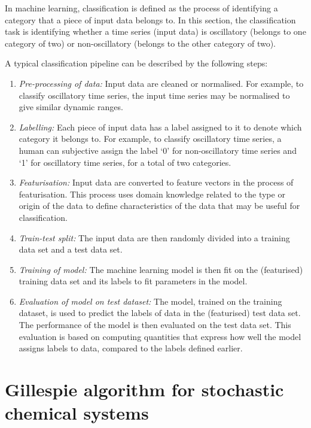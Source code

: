In machine learning, classification is defined as the process of identifying a category that a piece of input data belongs to.
In this section, the classification task is identifying whether a time series (input data) is oscillatory (belongs to one category of two) or non-oscillatory (belongs to the other category of two).

A typical classification pipeline can be described by the following steps:
\begin{enumerate}
  \item \emph{Pre-processing of data:} Input data are cleaned or normalised.
        For example, to classify oscillatory time series, the input time series may be normalised to give similar dynamic ranges.
  \item \emph{Labelling:} Each piece of input data has a label assigned to it to denote which category it belongs to.
        For example, to classify oscillatory time series, a human can subjective assign the label `0' for non-oscillatory time series and `1' for oscillatory time series, for a total of two categories.
  \item \emph{Featurisation:} Input data are converted to feature vectors in the process of featurisation.
        This process uses domain knowledge related to the type or origin of the data to define characteristics of the data that may be useful for classification.
  \item \emph{Train-test split:} The input data are then randomly divided into a training data set and a test data set.
  \item \emph{Training of model:} The machine learning model is then fit on the (featurised) training data set and its labels to fit parameters in the model.
  \item \emph{Evaluation of model on test dataset:}
        The model, trained on the training dataset, is used to predict the labels of data in the (featurised) test data set.
        The performance of the model is then evaluated on the test data set.
        This evaluation is based on computing quantities that express how well the model assigns labels to data, compared to the labels defined earlier.
\end{enumerate}


\section{Gillespie algorithm for stochastic chemical systems}
\label{append:analysis-gillespie}

